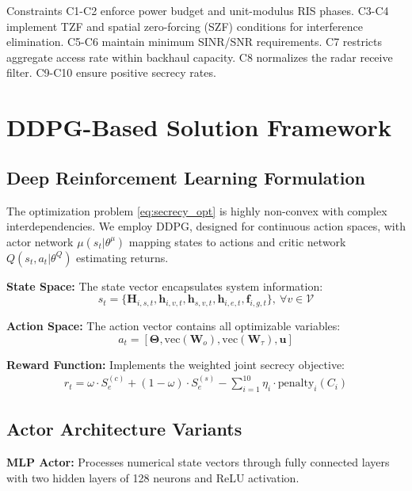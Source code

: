 \documentclass[conference]{IEEEtran}
\begin{document}
Constraints C1-C2 enforce power budget and unit-modulus RIS phases. C3-C4 implement TZF and spatial zero-forcing (SZF) conditions for interference elimination. C5-C6 maintain minimum SINR/SNR requirements. C7 restricts aggregate access rate within backhaul capacity. C8 normalizes the radar receive filter. C9-C10 ensure positive secrecy rates.

\section{DDPG-Based Solution Framework}

\subsection{Deep Reinforcement Learning Formulation}

The optimization problem \eqref{eq:secrecy_opt} is highly non-convex with complex interdependencies. We employ DDPG, designed for continuous action spaces, with actor network $\mu(s_t | \theta^{\mu})$ mapping states to actions and critic network $Q(s_t, a_t | \theta^Q)$ estimating returns.

\textbf{State Space:} The state vector encapsulates system information:
\begin{equation}
s_t = \{\mathbf{H}_{i,s,t}, \mathbf{h}_{i,v,t}, \mathbf{h}_{s,v,t}, \mathbf{h}_{i,e,t}, \mathbf{f}_{i,g,t}\},\ \forall v \in \mathcal{V}
\end{equation}

\textbf{Action Space:} The action vector contains all optimizable variables:
\begin{equation}
a_t = [\boldsymbol{\Theta}, \text{vec}(\mathbf{W}_{o}), \text{vec}(\mathbf{W}_{\tau}), \mathbf{u}]
\end{equation}

\textbf{Reward Function:} Implements the weighted joint secrecy objective:
\begin{align} 
r_t = \omega \cdot S^{(c)}_e + (1-\omega) \cdot S^{(s)}_e - \sum_{i=1}^{10} \eta_i \cdot \text{penalty}_i(C_i)
\end{align}

\subsection{Actor Architecture Variants}

\textbf{MLP Actor:} Processes numerical state vectors through fully connected layers with two hidden layers of 128 neurons and ReLU activation.
\end{document}
